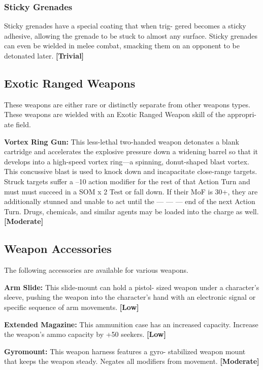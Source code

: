 \subsubsection{Sticky Grenades}

Sticky grenades have a special coating that when trig-
gered becomes a sticky adhesive, allowing the grenade 
to be stuck to almost any surface. Sticky grenades can 
even be wielded in melee combat, smacking them on 
an opponent to be detonated later. \textbf{[Trivial]}

\subsection{Exotic Ranged Weapons}

These weapons are either rare or distinctly separate 
from other weapons types. These weapons are wielded 
with an Exotic Ranged Weapon skill of the appropri-
ate field.

\textbf{Vortex Ring Gun:} This less-lethal two-handed 
weapon detonates a blank cartridge and accelerates 
the explosive pressure down a widening barrel so that 
it develops into a high-speed vortex ring—a spinning, 
donut-shaped blast vortex. This concussive blast is 
used to knock down and incapacitate close-range 
targets. Struck targets suffer a –10 action modifier for 
the rest of that Action Turn and must must succeed in 
a SOM x 2 Test or fall down. If their MoF is 30+, they 
are additionally stunned and unable to act until the 
—
—
—
end of the next Action Turn. Drugs, chemicals, and 
similar agents may be loaded into the charge as well. 
\textbf{[Moderate]}

\subsection{Weapon Accessories}

The following accessories are available for various 
weapons.

\textbf{Arm Slide:} This slide-mount can hold a pistol-
sized weapon under a character's sleeve, pushing the 
weapon into the character's hand with an electronic 
signal or specific sequence of arm movements. \textbf{[Low]}

\textbf{Extended Magazine:} This ammunition case has 
an increased capacity. Increase the weapon's ammo 
capacity by +50%
seekers. \textbf{[Low]}

\textbf{Gyromount:} This weapon harness features a gyro-
stabilized weapon mount that keeps the weapon steady. 
Negates all modifiers from movement. \textbf{[Moderate]}

